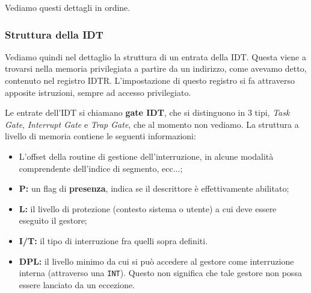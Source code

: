\documentclass[a4paper,11pt]{article}
\begin{document}
Vediamo questi dettagli in ordine.

\subsubsection{Struttura della IDT}
Vediamo quindi nel dettaglio la struttura di un entrata della IDT.
Questa viene a trovarsi nella memoria privilegiata a partire da un indirizzo, come avevamo detto, contenuto nel registro IDTR.
L'impostazione di questo registro si fa attraverso apposite istruzioni, sempre ad accesso privilegiato.

Le entrate dell'IDT si chiamano \textbf{gate IDT}, che si distinguono in 3 tipi, \textit{Task Gate}, \textit{Interrupt Gate} e \textit{Trap Gate}, che al momento non vediamo.
La struttura a livello di memoria contiene le seguenti informazioni:
\begin{itemize}
	\item L'offset della routine di gestione dell'interruzione, in alcune modalità comprendente dell'indice di segmento, ecc...;
	\item \textbf{P:} un flag di \textbf{presenza}, indica se il descrittore è effettivamente abilitato;
	\item \textbf{L:} il livello di protezione (contesto sistema o utente) a cui deve essere eseguito il gestore;
	\item \textbf{I/T:} il tipo di interruzione fra quelli sopra definiti.
	\item \textbf{DPL:} il livello minimo da cui si può accedere al gestore come interruzione interna (attraverso una \lstinline|INT|).
		Questo non significa che tale gestore non possa essere lanciato da un eccezione. 
\end{itemize}		
\end{document}
